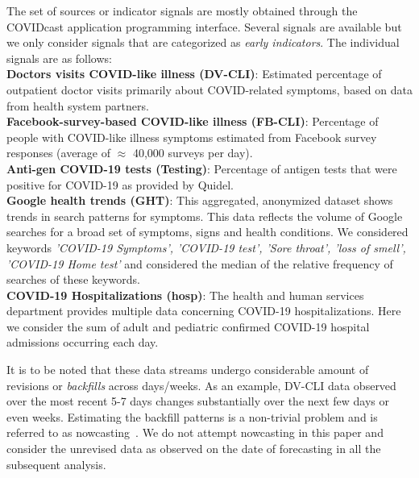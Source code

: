 \documentclass[conference,compsoc]{IEEEtran}
\begin{document}
The set of sources or indicator signals are mostly obtained through the COVIDcast application programming interface\cite{reinhart2021open}. Several signals are available but we only consider signals that are categorized as \emph{early indicators}. The individual signals are as follows:
\\
\textbf{Doctors visits COVID-like illness (DV-CLI)}: Estimated percentage of outpatient doctor visits primarily about COVID-related symptoms, based on data from health system partners.
\\
\textbf{Facebook-survey-based COVID-like illness (FB-CLI)}: Percentage of people with COVID-like illness symptoms estimated from Facebook survey responses (average of $\approx$ 40,000 surveys per day).
\\
\textbf{Anti-gen COVID-19 tests (Testing)}: Percentage of antigen tests that were positive for COVID-19 as provided by Quidel.  
\\
\textbf{Google health  trends (GHT)}: This aggregated, anonymized dataset shows trends in search patterns for symptoms. This data reflects the volume of Google searches for a broad set of symptoms, signs and health conditions. We considered keywords \emph{'COVID-19 Symptoms', 'COVID-19 test', 'Sore throat', 'loss of smell', 'COVID-19 Home test'} and considered the median of the relative frequency of searches of these keywords. 
\\
\textbf{COVID-19 Hospitalizations (hosp)}: The health and human services department provides multiple data concerning COVID-19 hospitalizations. Here we consider the sum of adult and pediatric confirmed COVID-19 hospital admissions occurring each day.

It is to be noted that these data streams undergo considerable amount of revisions or \emph{backfills} across days/weeks. As an example, DV-CLI data observed over the most recent 5-7 days changes substantially over the next few days or even weeks. Estimating the backfill patterns is a non-trivial problem and is referred to as nowcasting~\cite{mcdonald2021can}. We do not attempt nowcasting in this paper and consider the unrevised data as observed on the date of forecasting in all the subsequent analysis. 
\end{document}
